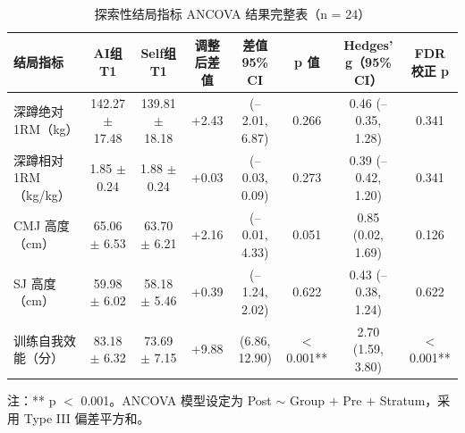 \begin{landscape}
\thispagestyle{empty}
\begin{table}[htbp]
\centering
\caption{探索性结局指标 ANCOVA 结果完整表（n = 24）}
\label{tab:app_ancova_full}
\begin{threeparttable}
\begin{tabular}{lccccccc}
\toprule
结局指标 & AI组T1 & Self组T1 & 调整后差值 & 差值 95\% CI & p 值 & Hedges' g（95\% CI） & FDR校正 p \\
\midrule
深蹲绝对 1RM（kg）        & 142.27 $\pm$ 17.48 & 139.81 $\pm$ 18.18 & +2.43  & (--2.01, 6.87)   & 0.266     & 0.46 (--0.35, 1.28) & 0.341 \\
深蹲相对 1RM（kg/kg）     & 1.85 $\pm$ 0.24    & 1.88 $\pm$ 0.24    & +0.03  & (--0.03, 0.09)   & 0.273     & 0.39 (--0.42, 1.20) & 0.341 \\
CMJ 高度（cm）            & 65.06 $\pm$ 6.53   & 63.70 $\pm$ 6.21   & +2.16  & (--0.01, 4.33)   & 0.051     & 0.85 (0.02, 1.69)   & 0.126 \\
SJ 高度（cm）             & 59.98 $\pm$ 6.02   & 58.18 $\pm$ 5.46   & +0.39  & (--1.24, 2.02)   & 0.622     & 0.43 (--0.38, 1.24) & 0.622 \\
训练自我效能（分） & 83.18 $\pm$ 6.32 & 73.69 $\pm$ 7.15 & +9.88  & (6.86, 12.90) & $<$0.001** & 2.70 (1.59, 3.80) & $<$0.001** \\
\bottomrule
\end{tabular}
\begin{tablenotes}[flushleft]\footnotesize
\item 注：** p $<$ 0.001。ANCOVA 模型设定为 Post $\sim$ Group $+$ Pre $+$ Stratum，采用 Type III 偏差平方和。
\end{tablenotes}
\end{threeparttable}
\end{table}
\end{landscape}

